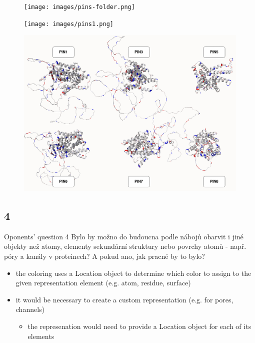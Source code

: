 \documentclass[
]{beamer}
\begin{document}
\begin{frame}
  \begin{figure}
    \texttt{[image: images/pins-folder.png]}
  \end{figure}
\end{frame}

\begin{frame}
  \begin{figure}
    \texttt{[image: images/pins1.png]}
  \end{figure}
\end{frame}

\begin{frame}
  \begin{figure}
    \includegraphics[width=1\textwidth,height=\textheight,keepaspectratio]{images/pins2.png}
  \end{figure}
\end{frame}

\subsection[4]{4}

\begin{frame}
  \begin{block}{Oponents' question 4}
    Bylo by možno do budoucna podle nábojů obarvit i jiné objekty než atomy, elementy sekundární struktury nebo povrchy atomů - např. póry a kanály v proteinech? A pokud ano, jak pracné by to bylo?
  \end{block}
  \begin{itemize}
    \item the coloring uses a Location object to determine which color to assign to the given representation element (e.g. atom, residue, surface)
    \item it would be necessary to create a custom representation (e.g. for pores, channels)
    \begin{itemize}
      \item the represenation would need to provide a Location object for each of its elements
    \end{itemize}
  \end{itemize}
\end{frame}
  
\section{\bibname}
\begin{frame}[t, allowframebreaks]{\bibname}
\printbibliography[heading=none]
\end{frame}

\makeoutro
\end{document}
